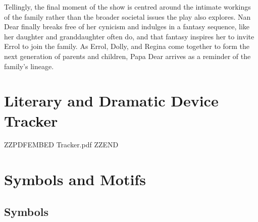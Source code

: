 \documentclass[a4paper]{article}
\begin{document}
Tellingly, the final moment of the show is centred around the
intimate workings of the family rather than the broader societal
issues the play also explores. Nan Dear finally breaks free of her
cynicism and indulges in a fantasy sequence, like her daughter and
granddaughter often do, and that fantasy inspires her to invite Errol
to join the family. As Errol, Dolly, and Regina come together to form
the next generation of parents and children, Papa Dear arrives as a
reminder of the family’s lineage.\\

\newpage

\section{Literary and Dramatic Device Tracker}



ZZPDFEMBED Tracker.pdf ZZEND



\newpage

\section{Symbols and Motifs}

\subsection{Symbols}
\renewcommand{\arraystretch}{1}
\end{document}
